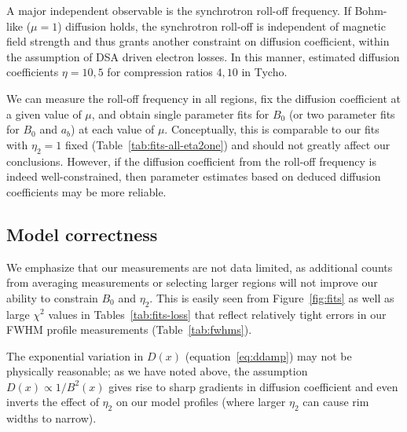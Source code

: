 \documentclass[iop, apj, numberedappendix]{emulateapj}
\newcommand*{\mt}{\mathrm}
\newcommand*{\Ecut}{E_{\mt{cut}}}
\newcommand*{\Bmin}{B_{\mt{min}}}
\begin{document}
A major independent observable is the synchrotron roll-off frequency.  If
Bohm-like ($\mu = 1$) diffusion holds, the synchrotron roll-off is independent
of magnetic field strength and thus grants another constraint on diffusion
coefficient, within the assumption of DSA driven electron losses.  In this
manner, \citet{parizot2006} estimated diffusion coefficients $\eta = 10, 5$ for
compression ratios $4, 10$ in Tycho.

We can measure the roll-off frequency in all regions, fix the diffusion
coefficient at a given value of $\mu$, and obtain single parameter fits for
$B_0$ (or two parameter fits for $B_0$ and $a_b$) at each value of $\mu$.
Conceptually, this is comparable to our fits with $\eta_2 = 1$ fixed
(Table~\ref{tab:fits-all-eta2one}) and should not greatly affect our
conclusions.  However, if the diffusion coefficient from the roll-off frequency
is indeed well-constrained, then parameter estimates based on deduced diffusion
coefficients may be more reliable.

\subsection{Model correctness}

We emphasize that our measurements are not data limited, as additional counts
from averaging measurements or selecting larger regions will not improve our
ability to constrain $B_0$ and $\eta_2$.  This is easily seen from
Figure~\ref{fig:fits} as well as large $\chi^2$ values in
Tables~\ref{tab:fits-loss} that reflect relatively tight errors in our FWHM
profile measurements (Table~\ref{tab:fwhms}).

The exponential variation in $D(x)$ (equation~\eqref{eq:ddamp}) may not be
physically reasonable; as we have noted above, the assumption $D(x)
\propto 1 / B^2(x)$ gives rise to sharp gradients in diffusion coefficient and
even inverts the effect of $\eta_2$ on our model profiles (where larger
$\eta_2$ can cause rim widths to narrow).


\end{document}
